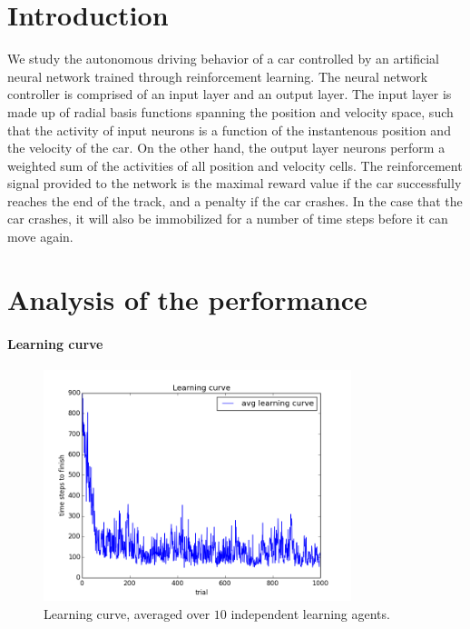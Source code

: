 \section{Introduction}
We study the autonomous driving behavior of a car controlled by an artificial neural network trained through reinforcement learning. The neural network controller is comprised of an input layer and an output layer. The input layer is made up of radial basis functions spanning the position and velocity space, such that the activity of input neurons is a function of the instantenous position and the velocity of the car. On the other hand, the output layer neurons perform a weighted sum of the activities of all position and velocity cells. The reinforcement signal provided to the network is the maximal reward value if the car successfully reaches the end of the track, and a penalty if the car crashes. In the case that the car crashes, it will also be immobilized for a number of time steps before it can move again. 

\section{Analysis of the performance}

\paragraph{Learning curve}

\begin{figure}[h!]
\centering
\includegraphics[width=0.8\textwidth]{figures/learning_curve.png}
\caption{Learning curve, averaged over $10$ independent learning agents.\label{fig:lcurve}}
\end{figure}

